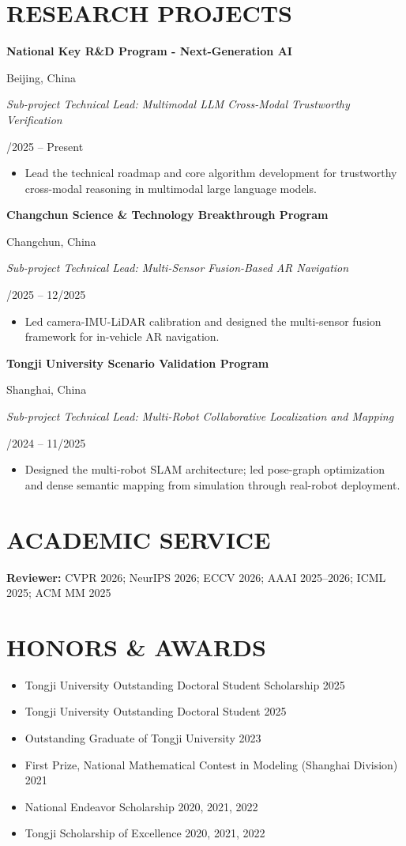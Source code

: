 \documentclass[11pt,a4paper]{article}
\newcommand{\twocolline}[2]{%
  \begin{minipage}[t]{0.76\textwidth}#1\end{minipage}\hfill%
  \begin{minipage}[t]{0.22\textwidth}\raggedleft #2\end{minipage}\par}
\newcommand{\datedline}[2]{\twocolline{\textbf{#1}}{#2}}
\newcommand{\roleline}[2]{\twocolline{\textit{#1}}{#2}\vspace{-0.15em}}
\begin{document}
\section{RESEARCH PROJECTS}
\datedline{National Key R\&D Program - Next-Generation AI}{Beijing, China}
\roleline{Sub-project Technical Lead: Multimodal LLM Cross-Modal Trustworthy Verification}{12/2025 -- Present}
\begin{itemize}
  \item Lead the technical roadmap and core algorithm development for trustworthy cross-modal reasoning in multimodal large language models.
\end{itemize}

\datedline{Changchun Science \& Technology Breakthrough Program}{Changchun, China}
\roleline{Sub-project Technical Lead: Multi-Sensor Fusion-Based AR Navigation}{01/2025 -- 12/2025}
\begin{itemize}
  \item Led camera-IMU-LiDAR calibration and designed the multi-sensor fusion framework for in-vehicle AR navigation.
\end{itemize}

\datedline{Tongji University Scenario Validation Program}{Shanghai, China}
\roleline{Sub-project Technical Lead: Multi-Robot Collaborative Localization and Mapping}{11/2024 -- 11/2025}
\begin{itemize}
  \item Designed the multi-robot SLAM architecture; led pose-graph optimization and dense semantic mapping from simulation through real-robot deployment.
\end{itemize}

\section{ACADEMIC SERVICE}
\textbf{Reviewer:} CVPR 2026; NeurIPS 2026; ECCV 2026; AAAI 2025--2026; ICML 2025; ACM MM 2025

\section{HONORS \& AWARDS}
\begin{itemize}
  \item Tongji University Outstanding Doctoral Student Scholarship \hfill 2025
  \item Tongji University Outstanding Doctoral Student \hfill 2025
  \item Outstanding Graduate of Tongji University \hfill 2023
  \item First Prize, National Mathematical Contest in Modeling (Shanghai Division) \hfill 2021
  \item National Endeavor Scholarship \hfill 2020, 2021, 2022
  \item Tongji Scholarship of Excellence \hfill 2020, 2021, 2022
\end{itemize}
\end{document}
